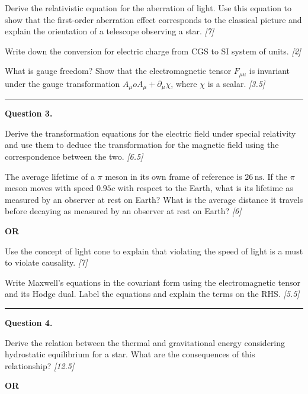 \documentclass[11pt,a4paper]{article}
\newcommand{\pts}[1]{\hfill   \textit{[#1]}}
\begin{document}
\begin{parts}
  \item Derive the relativistic equation for the aberration of light. Use this equation to show that the first-order aberration effect corresponds to the classical picture and explain the orientation of a telescope observing a star. \pts{7}
  \item Write down the conversion for electric charge from CGS to SI system of units. \pts{2}
  \item What is gauge freedom? Show that the electromagnetic tensor $F_{\mu
u}$ is invariant under the gauge transformation $A_\mu  o A_\mu + \partial_\mu \chi$, where $\chi$ is a scalar. \pts{3.5}
\end{parts}

\medskip\rule{\linewidth}{0.2pt}




\noindent   \textbf{Question 3.}

\begin{parts}
  \item Derive the transformation equations for the electric field under special relativity and use them to deduce the transformation for the magnetic field using the correspondence between the two. \pts{6.5}
  \item The average lifetime of a $\pi$ meson in its own frame of reference is $26\, \text{ns}$. If the $\pi$ meson moves with speed $0.95c$ with respect to the Earth, what is its lifetime as measured by an observer at rest on Earth? What is the average distance it travels before decaying as measured by an observer at rest on Earth? \pts{6}
\end{parts}
\hfill   \textbf{OR}

\begin{parts}
  \item Use the concept of light cone to explain that violating the speed of light is a must to violate causality. \pts{7}
  \item Write Maxwell's equations in the covariant form using the electromagnetic tensor and its Hodge dual. Label the equations and explain the terms on the RHS. \pts{5.5}
\end{parts}

\medskip\rule{\linewidth}{0.2pt}




\noindent   \textbf{Question 4.}

\begin{parts}
  \item Derive the relation between the thermal and gravitational energy considering hydrostatic equilibrium for a star. What are the consequences of this relationship? \pts{12.5}
\end{parts}
\hfill   \textbf{OR}
\end{document}
